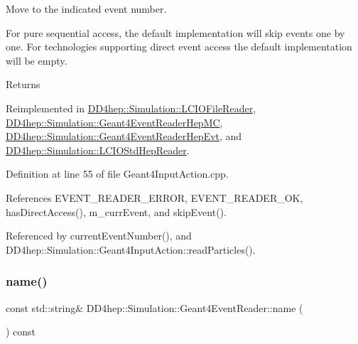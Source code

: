 Move to the indicated event number. 

For pure sequential access, the default implementation will skip events one by one. For technologies supporting direct event access the default implementation will be empty.

\begin{DoxyReturn}{Returns}

\end{DoxyReturn}


Reimplemented in \hyperlink{class_d_d4hep_1_1_simulation_1_1_l_c_i_o_file_reader_ad4648d75cd88d24476ff41e493b5c0ed}{D\+D4hep\+::\+Simulation\+::\+L\+C\+I\+O\+File\+Reader}, \hyperlink{class_d_d4hep_1_1_simulation_1_1_geant4_event_reader_hep_m_c_a95ba8736c8274f5b24b6cd0e0b424c33}{D\+D4hep\+::\+Simulation\+::\+Geant4\+Event\+Reader\+Hep\+MC}, \hyperlink{class_d_d4hep_1_1_simulation_1_1_geant4_event_reader_hep_evt_a9e8bf8ad3882ab62d481c6020b9adaed}{D\+D4hep\+::\+Simulation\+::\+Geant4\+Event\+Reader\+Hep\+Evt}, and \hyperlink{class_d_d4hep_1_1_simulation_1_1_l_c_i_o_std_hep_reader_a5f91d2bbdab11ee4554abf164acf1e1e}{D\+D4hep\+::\+Simulation\+::\+L\+C\+I\+O\+Std\+Hep\+Reader}.



Definition at line 55 of file Geant4\+Input\+Action.\+cpp.



References E\+V\+E\+N\+T\+\_\+\+R\+E\+A\+D\+E\+R\+\_\+\+E\+R\+R\+OR, E\+V\+E\+N\+T\+\_\+\+R\+E\+A\+D\+E\+R\+\_\+\+OK, has\+Direct\+Access(), m\+\_\+curr\+Event, and skip\+Event().



Referenced by current\+Event\+Number(), and D\+D4hep\+::\+Simulation\+::\+Geant4\+Input\+Action\+::read\+Particles().

\hypertarget{class_d_d4hep_1_1_simulation_1_1_geant4_event_reader_a4a5b4a2126e4667f79c80a22bd3f929b}{}\label{class_d_d4hep_1_1_simulation_1_1_geant4_event_reader_a4a5b4a2126e4667f79c80a22bd3f929b} 
\subsubsection{\texorpdfstring{name()}{name()}}
{\footnotesize\ttfamily const std\+::string\& D\+D4hep\+::\+Simulation\+::\+Geant4\+Event\+Reader\+::name (\begin{DoxyParamCaption}{ }\end{DoxyParamCaption}) const\hspace{0.3cm}{\ttfamily [inline]}}



